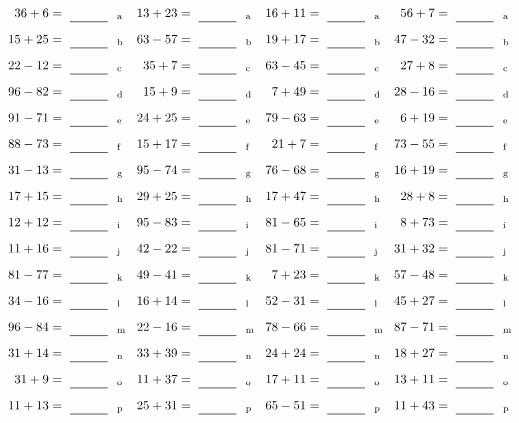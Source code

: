 \documentclass
[
  draft    = true,
  fontsize = 11pt,
  parskip  = half-
]
{scrartcl}
\begin{document}
\clearpage
\begin{align*}
    \pline{36+6}&=\rline{a}
  & \pline{13+23}&=\rline{a}
  & \pline{16+11}&=\rline{a}
  & \pline{56+7}&=\rline{a} \\[1ex]
    \pline{15+25}&=\rline{b}
  & \pline{63-57}&=\rline{b}
  & \pline{19+17}&=\rline{b}
  & \pline{47-32}&=\rline{b} \\[1ex]
    \pline{22-12}&=\rline{c}
  & \pline{35+7}&=\rline{c}
  & \pline{63-45}&=\rline{c}
  & \pline{27+8}&=\rline{c} \\[1ex]
    \pline{96-82}&=\rline{d}
  & \pline{15+9}&=\rline{d}
  & \pline{7+49}&=\rline{d}
  & \pline{28-16}&=\rline{d} \\[1ex]
    \pline{91-71}&=\rline{e}
  & \pline{24+25}&=\rline{e}
  & \pline{79-63}&=\rline{e}
  & \pline{6+19}&=\rline{e} \\[1ex]
    \pline{88-73}&=\rline{f}
  & \pline{15+17}&=\rline{f}
  & \pline{21+7}&=\rline{f}
  & \pline{73-55}&=\rline{f} \\[1ex]
    \pline{31-13}&=\rline{g}
  & \pline{95-74}&=\rline{g}
  & \pline{76-68}&=\rline{g}
  & \pline{16+19}&=\rline{g} \\[1ex]
    \pline{17+15}&=\rline{h}
  & \pline{29+25}&=\rline{h}
  & \pline{17+47}&=\rline{h}
  & \pline{28+8}&=\rline{h} \\[1ex]
    \pline{12+12}&=\rline{i}
  & \pline{95-83}&=\rline{i}
  & \pline{81-65}&=\rline{i}
  & \pline{8+73}&=\rline{i} \\[1ex]
    \pline{11+16}&=\rline{j}
  & \pline{42-22}&=\rline{j}
  & \pline{81-71}&=\rline{j}
  & \pline{31+32}&=\rline{j} \\[1ex]
    \pline{81-77}&=\rline{k}
  & \pline{49-41}&=\rline{k}
  & \pline{7+23}&=\rline{k}
  & \pline{57-48}&=\rline{k} \\[1ex]
    \pline{34-16}&=\rline{l}
  & \pline{16+14}&=\rline{l}
  & \pline{52-31}&=\rline{l}
  & \pline{45+27}&=\rline{l} \\[1ex]
    \pline{96-84}&=\rline{m}
  & \pline{22-16}&=\rline{m}
  & \pline{78-66}&=\rline{m}
  & \pline{87-71}&=\rline{m} \\[1ex]
    \pline{31+14}&=\rline{n}
  & \pline{33+39}&=\rline{n}
  & \pline{24+24}&=\rline{n}
  & \pline{18+27}&=\rline{n} \\[1ex]
    \pline{31+9}&=\rline{o}
  & \pline{11+37}&=\rline{o}
  & \pline{17+11}&=\rline{o}
  & \pline{13+11}&=\rline{o} \\[1ex]
    \pline{11+13}&=\rline{p}
  & \pline{25+31}&=\rline{p}
  & \pline{65-51}&=\rline{p}
  & \pline{11+43}&=\rline{p}
\end{align*}
\end{document}
